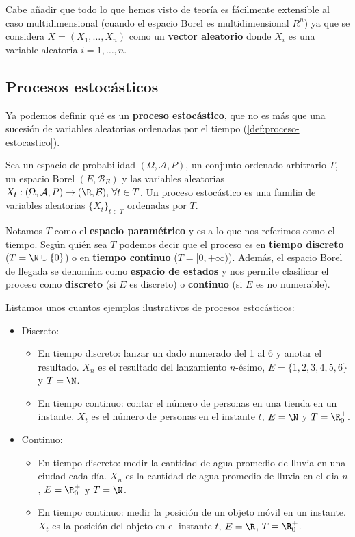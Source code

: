 Cabe añadir que todo lo que hemos visto de teoría es fácilmente extensible al caso multidimensional (cuando el espacio Borel es multidimensional $R^n$) ya que se considera $X = (X_1, \ldots, X_n)$ como un \textbf{vector aleatorio} donde $X_i$ es una variable aleatoria $i = 1, \ldots, n$.

\subsection{Procesos estocásticos}

Ya podemos definir qué es un \textbf{proceso estocástico}, que no es más que una sucesión de variables aleatorias ordenadas por el tiempo (\autoref{def:proceso-estocastico}).

\begin{definicion}
  Sea un espacio de probabilidad $(\Omega, \mathcal{A}, P)$, un conjunto ordenado arbitrario $T$, un espacio Borel $(E, \mathcal{B}_E)$ y las variables aleatorias $X_t : (\Omega, \mathcal{A}, P) \to (\R, \mathcal{B}), \, \forall t \in T$. Un proceso estocástico es una familia de variables aleatorias $\{X_t\}_{t \in T}$ ordenadas por $T$.
  \label{def:proceso-estocastico}
\end{definicion}

Notamos $T$ como el \textbf{espacio paramétrico} y es a lo que nos referimos como el tiempo. Según quién sea $T$ podemos decir que el proceso es en \textbf{tiempo discreto} ($T = \N \cup \{0\}$) o en \textbf{tiempo continuo} ($T = [0, + \infty)$). Además, el espacio Borel de llegada se denomina como \textbf{espacio de estados} y nos permite clasificar el proceso como \textbf{discreto} (si $E$ es discreto) o \textbf{continuo} (si $E$ es no numerable).

Listamos unos cuantos ejemplos ilustrativos de procesos estocásticos:
\begin{itemize}
  \item Discreto:
    \begin{itemize}
      \item En tiempo discreto: lanzar un dado numerado del 1 al 6 y anotar el resultado. $X_n$ es el resultado del lanzamiento $n$-ésimo, $E = \{1, 2, 3, 4, 5, 6\}$ y $T = \N$.
      \item En tiempo continuo: contar el número de personas en una tienda en un instante. $X_t$ es el número de personas en el instante $t$, $E = \N$ y $T = \R^+_0$.
    \end{itemize}
  \item Continuo:
    \begin{itemize}
      \item En tiempo discreto: medir la cantidad de agua promedio de lluvia en una ciudad cada día. $X_n$ es la cantidad de agua promedio de lluvia en el dia $n$, $E = \R^+_0$ y $T = \N$.
      \item En tiempo continuo: medir la posición de un objeto móvil en un instante. $X_t$ es la posición del objeto en el instante $t$, $E = \R$, $T = \R^+_0$.
    \end{itemize}
\end{itemize}

